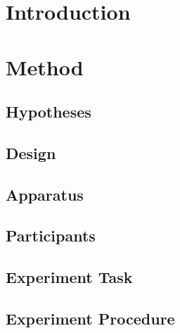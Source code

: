 \section{Introduction} \label{sec:Exp2:Intro}


\section{Method} \label{sec:Exp2:Method}


%

\subsection{Hypotheses} \label{sec:Exp2:Hypotheses}


\subsection{Design} \label{sec:Exp2:Method:Design}


\subsection{Apparatus} \label{sec:Exp2:Method:Apparatus}


\subsection{Participants} \label{sec:Exp2:Method:Participants}


\subsection{Experiment Task} \label{sec:Exp2:Method:Task}


\subsection{Experiment Procedure} \label{sec:Exp2:Method:Procedure}


